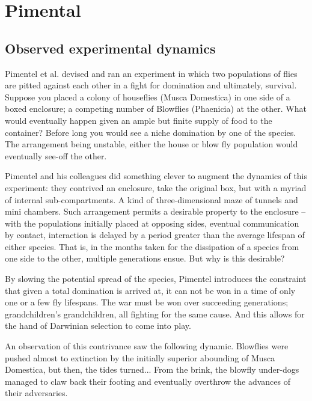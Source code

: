 \section{Pimental}



\subsection*{Observed experimental dynamics}

Pimentel et al. devised and ran an experiment in which two populations of flies are pitted against each other in a fight for domination and ultimately, survival. \cite{pimentel1965selection}
\cite{hutchingson2018ecological} Suppose you placed a colony of houseflies (Musca Domestica) in one side of a boxed enclosure; a competing number of Blowflies (Phaenicia) at the other. What would eventually happen given an ample but finite supply of food to the container? Before long you would see a niche domination by one of the species. The arrangement being unstable, either the house or blow fly population would eventually see-off the other.\par
Pimentel and his colleagues did something clever to augment the dynamics of this experiment: they contrived an enclosure, take the original box, but with a myriad of internal sub-compartments. A kind of three-dimensional maze of tunnels and mini chambers. Such arrangement permits a desirable property to the enclosure -- with the populations initially placed at opposing sides, eventual communication by contact, interaction is delayed by a period greater than the average lifespan of either species. That is, in the months taken for the dissipation of a species from one side to the other, multiple generations ensue. But why is this desirable?\par
By slowing the potential spread of the species, Pimentel introduces the constraint that given a total domination is arrived at, it can not be won in a time of only one or a few fly lifespans. The war must be won over succeeding generations; grandchildren's grandchildren, all fighting for the same cause. And this allows for the hand of Darwinian selection to come into play.\par
An observation of this contrivance saw the following dynamic. Blowflies were pushed almost to extinction by the initially superior abounding of Musca Domestica, but then, the tides turned... From the brink, the blowfly under-dogs managed to claw back their footing and eventually overthrow the advances of their adversaries.\par
